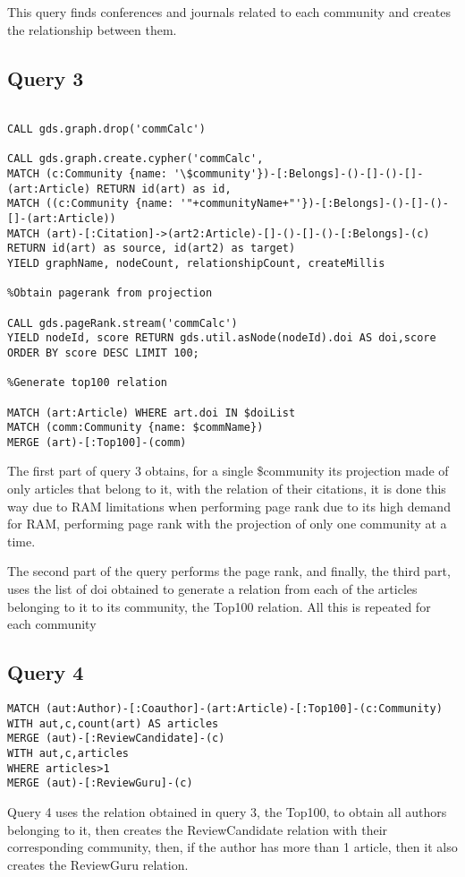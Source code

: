 \documentclass[11pt, a4paper]{article}
\begin{document}
This query finds conferences and journals related to each community and creates the relationship between them.

\subsection{Query 3}
\begin{lstlisting}[basicstyle=\tiny,breaklines=false]
%Obtain Cypher projection

CALL gds.graph.drop('commCalc')

CALL gds.graph.create.cypher('commCalc',
MATCH (c:Community {name: '\$community'})-[:Belongs]-()-[]-()-[]-(art:Article) RETURN id(art) as id,
MATCH ((c:Community {name: '"+communityName+"'})-[:Belongs]-()-[]-()-[]-(art:Article))
MATCH (art)-[:Citation]->(art2:Article)-[]-()-[]-()-[:Belongs]-(c)
RETURN id(art) as source, id(art2) as target)
YIELD graphName, nodeCount, relationshipCount, createMillis

%Obtain pagerank from projection

CALL gds.pageRank.stream('commCalc')
YIELD nodeId, score RETURN gds.util.asNode(nodeId).doi AS doi,score ORDER BY score DESC LIMIT 100;

%Generate top100 relation

MATCH (art:Article) WHERE art.doi IN $doiList
MATCH (comm:Community {name: $commName})
MERGE (art)-[:Top100]-(comm)
\end{lstlisting}

The first part of query 3 obtains, for a single \$community its projection made of only articles that belong to it, with the relation of their citations, it is done this way due to RAM limitations when performing page rank due to its high demand for RAM, performing page rank with the projection of only one community at a time.

The second part of the query performs the page rank, and finally, the third part, uses the list of doi obtained to generate a relation from each of the articles belonging to it to its community, the Top100 relation. All this is repeated for each community

\subsection{Query 4}
\begin{lstlisting}[basicstyle=\tiny,breaklines=false]
MATCH (aut:Author)-[:Coauthor]-(art:Article)-[:Top100]-(c:Community)
WITH aut,c,count(art) AS articles
MERGE (aut)-[:ReviewCandidate]-(c)
WITH aut,c,articles
WHERE articles>1
MERGE (aut)-[:ReviewGuru]-(c)
\end{lstlisting}

Query 4 uses the relation obtained in query 3, the Top100, to obtain all authors belonging to it, then creates the ReviewCandidate relation with their corresponding community, then, if the author has more than 1 article, then it also creates the ReviewGuru relation.

%
%
\end{document}
